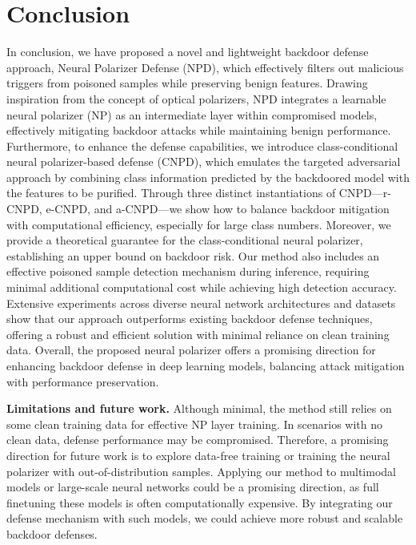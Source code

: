 \section{Conclusion\label{sec5}}
In conclusion, we have proposed a novel and lightweight backdoor defense approach, Neural Polarizer Defense (NPD), which effectively filters out malicious triggers from poisoned samples while preserving benign features. Drawing inspiration from the concept of optical polarizers, NPD integrates a learnable neural polarizer (NP) as an intermediate layer within compromised models, effectively mitigating backdoor attacks while maintaining benign performance. 
Furthermore, to enhance the defense capabilities, we introduce class-conditional neural polarizer-based defense (CNPD), which emulates the targeted adversarial approach by combining class information predicted by the backdoored model with the features to be purified. 
Through three distinct instantiations of CNPD—r-CNPD, e-CNPD, and a-CNPD—we show how to balance backdoor mitigation with computational efficiency, especially for large class numbers.
Moreover, we provide a theoretical guarantee for the class-conditional neural polarizer, establishing an upper bound on backdoor risk.
Our method also includes an effective poisoned sample detection mechanism during inference, requiring minimal additional computational cost while achieving high detection accuracy. Extensive experiments across diverse neural network architectures and datasets show that our approach outperforms existing backdoor defense techniques, offering a robust and efficient solution with minimal reliance on clean training data.
Overall, the proposed neural polarizer offers a promising direction for enhancing backdoor defense in deep learning models, balancing attack mitigation with performance preservation.

\textbf{Limitations and future work.}
Although minimal, the method still relies on some clean training data for effective NP layer training. In scenarios with no clean data, defense performance may be compromised. Therefore, a promising direction for future work is to explore data-free training or training the neural polarizer with out-of-distribution samples. Applying our method to multimodal models or large-scale neural networks could be a promising direction, as full finetuning these models is often computationally expensive. By integrating our defense mechanism with such models, we could achieve more robust and scalable backdoor defenses.



